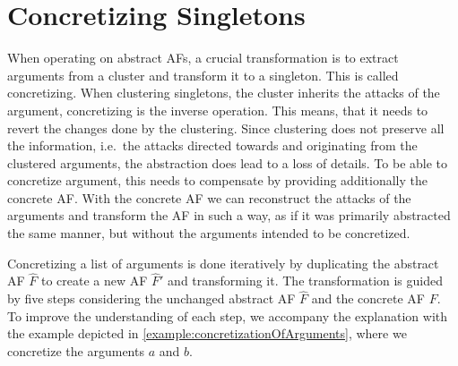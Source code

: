 \section{Concretizing Singletons}
\label{sec:ConcretizingSingletons}
When operating on abstract AFs, a crucial transformation is to extract arguments from a cluster and transform it to a singleton. This is called concretizing. When clustering singletons, the cluster inherits the attacks of the argument, concretizing is the inverse operation. This means, that it needs to revert the changes done by the clustering. Since clustering does not preserve all the information, i.e.\ the attacks directed towards and originating from the clustered arguments, the abstraction does lead to a loss of details. To be able to concretize argument, this needs to compensate by providing additionally the concrete AF. With the concrete AF we can reconstruct the attacks of the arguments and transform the AF in such a way, as if it was primarily abstracted the same manner, but without the arguments intended to be concretized.

Concretizing a list of arguments is done iteratively by duplicating the abstract AF $\hat{F}$ to create a new AF $\hat{F}'$ and transforming it. The transformation is guided by five steps considering the unchanged abstract AF $\hat{F}$ and the concrete AF $F$. To improve the understanding of each step, we accompany the explanation with the example depicted in \cref{example:concretizationOfArguments}, where we concretize the arguments $a$ and $b$.


